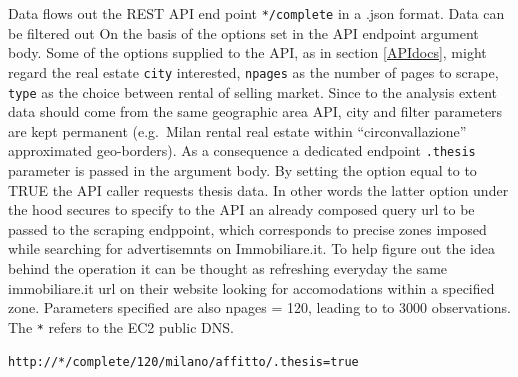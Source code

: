 \documentclass[
  12pt,
  a4paper,
  oneside]{book}
\newcommand{\passthrough}[1]{#1}
\theoremstyle{definition}
\theoremstyle{definition}
\theoremstyle{definition}
\theoremstyle{remark}
\begin{document}
Data flows out the REST API end point \passthrough{\lstinline!*/complete!} in a .json format. Data can be filtered out On the basis of the options set in the API endpoint argument body. Some of the options supplied to the API, as in section \ref{APIdocs}, might regard the real estate \passthrough{\lstinline!city!} interested, \passthrough{\lstinline!npages!} as the number of pages to scrape, \passthrough{\lstinline!type!} as the choice between rental of selling market. Since to the analysis extent data should come from the same geographic area API, city and filter parameters are kept permanent (e.g.~Milan rental real estate within ``circonvallazione'' approximated geo-borders). As a consequence a dedicated endpoint \passthrough{\lstinline!.thesis!} parameter is passed in the argument body. By setting the option equal to to TRUE the API caller requests thesis data. In other words the latter option under the hood secures to specify to the API an already composed query url to be passed to the scraping endppoint, which corresponds to precise zones imposed while searching for advertisemnts on Immobiliare.it. To help figure out the idea behind the operation it can be thought as refreshing everyday the same immobiliare.it url on their website looking for accomodations within a specified zone.
Parameters specified are also npages = 120, leading to to 3000 observations. The \passthrough{\lstinline!*!} refers to the EC2 public DNS.

\passthrough{\lstinline!http://*/complete/120/milano/affitto/.thesis=true!}
\end{document}
